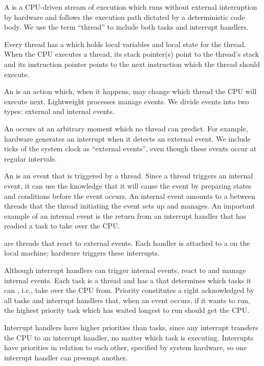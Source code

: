 A  is a CPU-driven stream of execution which runs without
external interruption by hardware and follows the execution path dictated by
a deterministic code body.  We use the term ``thread'' to include both
tasks and interrupt handlers.

Every thread has a  which holds local variables and local
state for the thread.  When the CPU executes a thread, its stack pointer(s)
point to the thread's stack and its instruction pointer points to the next
instruction which the thread should execute.

An  is an action which, when it happens, may change which
thread the CPU will execute next.  Lightweight processes manage events.
We divide events into two types: external and internal events.  

An  occurs at an arbitrary moment which no thread 
can predict.  For example, hardware generates an interrupt when it detects 
an external event.
We include ticks of the system clock as ``external events'', even though
these events occur at regular intervals.

An  is an event that is triggered by a thread.  Since
a thread triggers an internal event, it can use the knowledge that it will
cause the event by preparing states and conditions before the event occurs.
An internal event amounts to a  between
threads that the thread initiating the event sets up and manages.
An important example of an internal event is the return from an interrupt
handler that has readied a task to take over the CPU.

 are threads that react to external events.
Each handler is attached to a  on the local
machine; hardware triggers these interrupts.

Although interrupt handlers can trigger internal events, 
react to and manage internal events.  Each task is a thread and has a
 that determines which tasks it can ,
i.e., take over the CPU from.  Priority constitutes a right acknowledged
by all tasks and interrupt handlers that, when an event occurs, if it wants
to run, the highest priority task which has waited longest to run should get
the CPU.

Interrupt handlers have higher priorities than tasks, since any interrupt
transfers the CPU to an interrupt handler, no matter which task is
executing.  Interrupts have priorities in relation to each other, specified
by system hardware, so one interrupt handler can preempt another.

